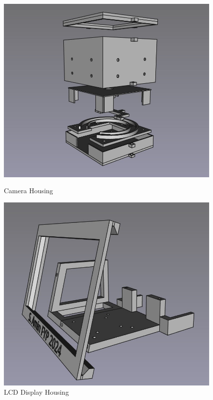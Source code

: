\begin{figure}
\begin{minipage}[t]{0.32\textwidth}
    \includegraphics[width=\textwidth]{imgs/freecad/camera_case.jpg}
    \caption{Camera Housing}
    \label{fig:camerahousing}
  \end{minipage}
  \hfill
  \begin{minipage}[t]{0.32\textwidth}
    \centering
    \includegraphics[width=\textwidth]{imgs/freecad/lcd_mount.jpg}
    \caption{LCD Display Housing}
  \end{minipage}
\end{figure}

